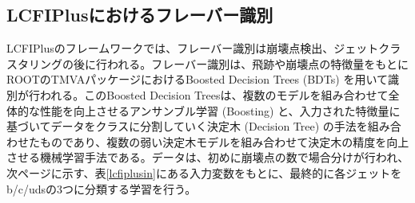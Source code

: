 \subsection{LCFIPlusにおけるフレーバー識別}
LCFIPlusのフレームワークでは、フレーバー識別は崩壊点検出、ジェットクラスタリングの後に行われる。フレーバー識別は、飛跡や崩壊点の特徴量をもとにROOTのTMVAパッケージにおけるBoosted Decision Trees (BDTs) を用いて識別が行われる。このBoosted Decision Treesは、複数のモデルを組み合わせて全体的な性能を向上させるアンサンブル学習 (Boosting) と、入力された特徴量に基づいてデータをクラスに分割していく決定木 (Decision Tree) の手法を組み合わせたものであり、複数の弱い決定木モデルを組み合わせて決定木の精度を向上させる機械学習手法である。データは、初めに崩壊点の数で場合分けが行われ、次ページに示す、表\ref{lcfiplusin}にある入力変数をもとに、最終的に各ジェットをb/c/udsの3つに分類する学習を行う。
